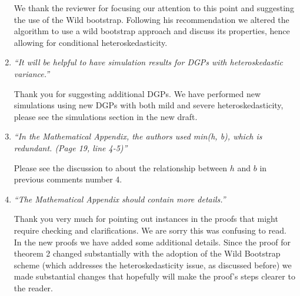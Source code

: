 \documentclass[12pt,fleqn]{article}
\begin{document}
\begin{enumerate}
 We thank the reviewer for focusing our attention to this point and suggesting the use of the Wild bootstrap. Following his recommendation we altered the algorithm to use a wild bootstrap approach and discuss its properties, hence allowing for conditional heteroskedasticity.

\item \textit{``It will be helpful to have simulation results for DGPs with heteroskedastic variance.''}

 Thank you for suggesting additional DGPs. We have performed new simulations using new DGPs with both mild and severe heteroskedasticity, please see the simulations section in the new draft.

\item \textit{``In the Mathematical Appendix, the authors used min(h, b), which is redundant. (Page 19, line 4-5)''}

Please see the discussion to about the relationship between $h$ and $b$ in previous comments number 4.

\item \textit{``The Mathematical Appendix should contain more details.''}

Thank you very much for pointing out instances in the proofs that might require checking and clarifications. We are sorry this was confusing to read. In the new proofs we have added some additional details. Since the proof for theorem 2 changed substantially with the adoption of the Wild Bootstrap scheme (which addresses the heteroskedasticity issue, as discussed before) we made substantial changes that hopefully will make the proof's steps clearer to the reader. 

\end{enumerate}
\end{document}
